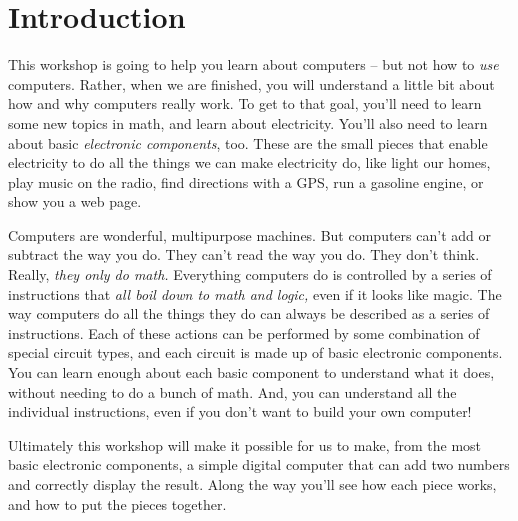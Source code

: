 \section{Introduction}

This workshop is going to help you learn about computers -- but not how to \emph{use} computers. Rather, when we are finished, you will understand a little bit about how and why computers really work. To get to that goal, you'll need to learn some new topics in math, and learn about electricity. You'll also need to learn about basic \emph{electronic components}, too. These are the small pieces that enable electricity to do all the things we can make electricity do, like light our homes, play music on the radio, find directions with a GPS, run a gasoline engine, or show you a web page.

Computers are wonderful, multipurpose machines. But computers can't add or subtract the way you do. They can't read the way you do. They don't think. Really,  \emph{they only do math.} Everything computers do is controlled by a series of instructions that \emph{all boil down to math and logic,} even if it looks like magic. The way computers do all the things they do can always be described as a  series of instructions. Each of these actions can be performed by some combination of special circuit types, and each circuit is made up of basic electronic components. You can learn enough about each basic component to understand what it does, without needing to do a bunch of math. And, you can understand all the individual instructions, even if you don't want to build your own computer!

Ultimately this workshop will make it possible for us to make, from the most basic electronic components, a simple digital computer that can add two numbers and correctly display the result. Along the way you'll see how each piece works, and how to put the pieces together. 

